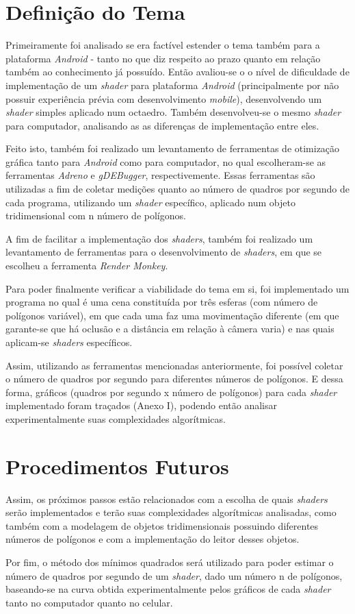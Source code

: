 \section{Definição do Tema}

Primeiramente foi analisado se era factível estender o tema também para a plataforma \textit{Android} - tanto no que diz respeito ao prazo quanto em relação também ao conhecimento já possuído. Então avaliou-se o o nível de dificuldade de implementação de um  \textit{shader} para plataforma \textit{Android} (principalmente por não possuir experiência prévia com desenvolvimento \textit{mobile}), desenvolvendo um \textit{shader} simples aplicado num octaedro. Também desenvolveu-se o mesmo \textit{shader} para computador, analisando as as diferenças de implementação entre eles.  

Feito isto, também foi realizado um levantamento de ferramentas de otimização gráfica tanto para \textit{Android} como para computador, no qual escolheram-se as ferramentas \textit{Adreno} e \textit{gDEBugger}, respectivemente. Essas ferramentas são utilizadas a fim de coletar medições quanto ao número de quadros por segundo de cada programa, utilizando um \textit{shader} específico, aplicado num objeto tridimensional com n número de polígonos. 

A fim de facilitar a implementação dos \textit{shaders}, também foi realizado um levantamento de ferramentas para o desenvolvimento de \textit{shaders}, em que se escolheu a ferramenta \textit{Render Monkey}.

Para poder finalmente verificar a viabilidade do tema em si, foi implementado um programa no qual é uma cena constituída por três esferas (com número de polígonos variável), em que cada uma faz uma movimentação diferente (em que garante-se que há oclusão e a distância em relação à câmera varia) e nas quais aplicam-se \textit{shaders} específicos.   

Assim, utilizando as ferramentas mencionadas anteriormente, foi possível coletar o número de quadros por segundo para diferentes números de polígonos. E dessa forma, gráficos (quadros por segundo x número de polígonos) para cada \textit{shader} implementado foram traçados (Anexo I), podendo então analisar experimentalmente suas complexidades algorítmicas.

\section{Procedimentos Futuros}

Assim, os próximos passos estão relacionados com a escolha de quais \textit{shaders} serão implementados e terão suas complexidades algorítmicas analisadas, como também com a modelagem de objetos tridimensionais possuindo diferentes números de polígonos e com a implementação do leitor desses objetos. 

Por fim, o método dos mínimos quadrados será utilizado para poder estimar o número de quadros por segundo de um \textit{shader}, dado um número n de polígonos, baseando-se na curva obtida experimentalmente pelos gráficos de cada \textit{shader} tanto no computador quanto no celular. 



